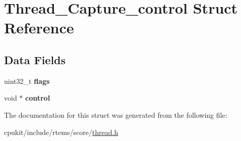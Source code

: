 \hypertarget{structThread__Capture__control}{}\section{Thread\+\_\+\+Capture\+\_\+control Struct Reference}
\label{structThread__Capture__control}
\subsection*{Data Fields}
\begin{DoxyCompactItemize}
\item 
\mbox{\label{structThread__Capture__control_a715697fded2220e1b2d7fac441c54270}} 
uint32\+\_\+t {\bfseries flags}
\item 
\mbox{\label{structThread__Capture__control_a826eace6e27d747c4f4ae22a78d07f1c}} 
void $\ast$ {\bfseries control}
\end{DoxyCompactItemize}


The documentation for this struct was generated from the following file\+:\begin{DoxyCompactItemize}
\item 
cpukit/include/rtems/score/\mbox{\hyperlink{score_2thread_8h}{thread.\+h}}\end{DoxyCompactItemize}

